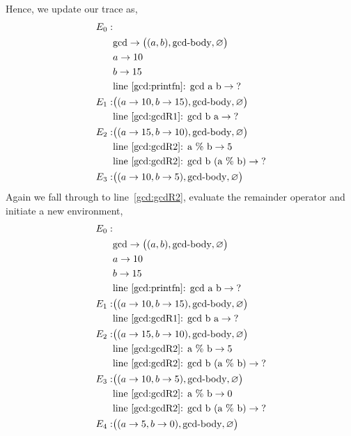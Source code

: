 \documentclass[fsharpnotes.tex]{subfiles}
\begin{document}
Hence, we update our trace as,
\begin{align*}
  E_0:&\\
      & \text{gcd} \rightarrow \big((a, b), \text{gcd-body}, \varnothing\big)\\
      & a \rightarrow 10\\
      & b \rightarrow 15\\
      & \text{line~\ref{gcd:printfn}: gcd a b} \rightarrow \text{?}\\
  E_1:& \big((a \rightarrow 10, b \rightarrow 15), \text{gcd-body}, \varnothing\big)\\
      & \text{line~\ref{gcd:gcdR1}: gcd b a} \rightarrow \text{?}\\
  E_2:& \big((a \rightarrow 15, b \rightarrow 10), \text{gcd-body}, \varnothing\big)\\
      & \text{line~\ref{gcd:gcdR2}: a \% b} \rightarrow 5\\
      & \text{line~\ref{gcd:gcdR2}: gcd b (a \% b)} \rightarrow \text{?}\\
  E_3:& \big((a \rightarrow 10, b \rightarrow 5), \text{gcd-body}, \varnothing\big)\\
\end{align*}
Again we fall through to line~\ref{gcd:gcdR2}, evaluate the remainder operator and initiate a new environment,
\begin{align*}
  E_0:&\\
      & \text{gcd} \rightarrow \big((a, b), \text{gcd-body}, \varnothing\big)\\
      & a \rightarrow 10\\
      & b \rightarrow 15\\
      & \text{line~\ref{gcd:printfn}: gcd a b} \rightarrow \text{?}\\
  E_1:& \big((a \rightarrow 10, b \rightarrow 15), \text{gcd-body}, \varnothing\big)\\
      & \text{line~\ref{gcd:gcdR1}: gcd b a} \rightarrow \text{?}\\
  E_2:& \big((a \rightarrow 15, b \rightarrow 10), \text{gcd-body}, \varnothing\big)\\
      & \text{line~\ref{gcd:gcdR2}: a \% b} \rightarrow 5\\
      & \text{line~\ref{gcd:gcdR2}: gcd b (a \% b)} \rightarrow \text{?}\\
  E_3:& \big((a \rightarrow 10, b \rightarrow 5), \text{gcd-body}, \varnothing\big)\\
      & \text{line~\ref{gcd:gcdR2}: a \% b} \rightarrow 0\\
      & \text{line~\ref{gcd:gcdR2}: gcd b (a \% b)} \rightarrow \text{?}\\
  E_4:& \big((a \rightarrow 5, b \rightarrow 0), \text{gcd-body}, \varnothing\big)\\
\end{align*}
\end{document}

